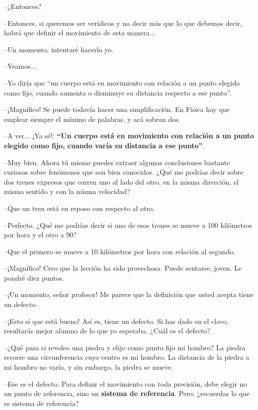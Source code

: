 {{  --¿Entonces?
   
  --Entonces, si queremos ser verídicos y no decir más que lo que debemos decir, habrá que definir el movimiento de esta manera...
   
  --Un momento, intentaré hacerlo yo.
   
  --Veamos...
   
  --Yo diría que ``un cuerpo está en movimiento con relación a un punto elegido como fijo, cuando aumenta o disminuye su distancia respecto a ese punto''.
   
  --¡Magnífico! Se puede todavía hacer una simplificación. En Física hay que emplear siempre el mínimo de palabras, y acá sobran dos.
   
  --A ver... ¡Ya sé!: {\bf ``Un cuerpo está en movimiento con relación a un punto elegido como fijo, cuando varía su distancia a ese punto''}.
   
  --Muy bien. Ahora tú mismo puedes extraer algunas conclusiones bastante curiosas sobre fenómenos que son bien conocidos. ¿Qué me podrías decir sobre dos trenes expresos que corren uno al lado del otro, en la misma dirección, el mismo sentido y con la misma velocidad?
   
  --Que un tren está en reposo con respecto al otro.
   
  --Perfecto. ¿Qué me podrías decir si uno de esos trenes se mueve a 100 kilómetros por hora y el otro a 90?
   
  --Que el primero se mueve a 10 kilómetros por hora con relación al segundo.
   
  --¡Magnífico! Creo que la lección ha sido provechosa. Puede sentarse, joven. Le pondré diez puntos.
   
  --¡Un momento, señor profesor! Me parece que la definición que usted acepta tiene un defecto.
   
  --¡Esto sí que está bueno! Así es, tiene un defecto. Si has dado en el clavo, resultarás mejor alumno de lo que yo esperaba. ¿Cuál es el defecto?
   
  --¿Qué pasa si revoleo una piedra y elijo como punto fijo mi hombro? La piedra recorre una circunferencia cuyo centro es mi hombro. La distancia de la piedra a mi hombro no varía, y sin embargo, la piedra se mueve.
   
  --Ese es el defecto. Para definir el movimiento con toda precisión, debe elegir no un punto de referencia, sino un {\bf sistema de referencia}. Pero, ¿recuerdas lo que es sistema de referencia?
   
}}
